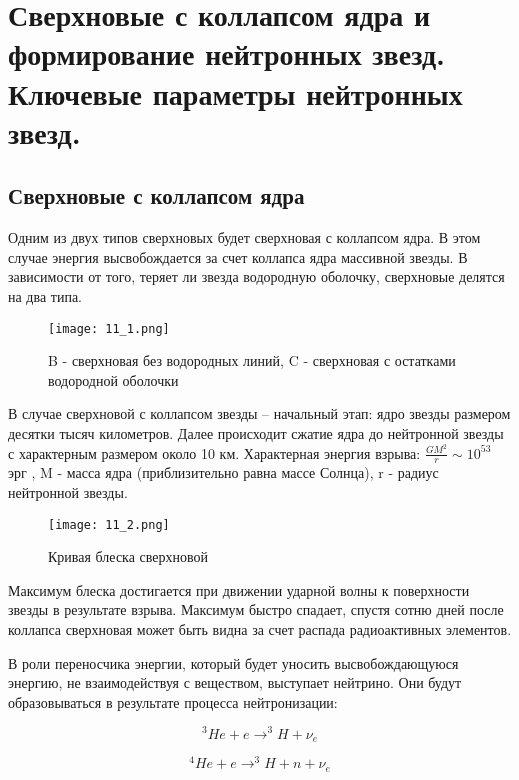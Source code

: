 
\parindent=1cm

\section{Сверхновые с коллапсом ядра и формирование нейтронных звезд. Ключевые параметры
нейтронных звезд.}

\subsection{Сверхновые с коллапсом ядра}
Одним из двух типов сверхновых будет сверхновая с коллапсом ядра. В этом случае энергия высвобождается за счет коллапса ядра массивной звезды. В зависимости от того, теряет ли звезда водородную оболочку, сверхновые делятся на два типа.

\begin{figure}[H]
\centering
\texttt{[image: 11\_1.png]}
\caption{B - сверхновая без водородных линий, C - сверхновая с остатками водородной оболочки}
\label{ЛЕЙБЛ ДЛЯ ССЫЛКИ НА КАРТИНКУ}
\end{figure}

В случае сверхновой с коллапсом звезды -- начальный этап: ядро звезды размером десятки тысяч километров. Далее происходит сжатие ядра до нейтронной звезды с характерным размером около 10 км. Характерная энергия взрыва: $\frac{GM^2}{r} \sim 10^{53}$ эрг , M -  масса ядра (приблизительно равна массе Солнца), r - радиус нейтронной звезды. 

\begin{figure}[H]
\centering
\texttt{[image: 11\_2.png]}
\caption{Кривая блеска сверхновой}
\label{ЛЕЙБЛ ДЛЯ ССЫЛКИ НА КАРТИНКУ}
\end{figure}


Максимум блеска достигается при движении ударной волны к поверхности звезды в результате взрыва. Максимум быстро спадает, спустя сотню дней после коллапса сверхновая может быть видна за счет распада радиоактивных элементов. 



В роли переносчика энергии, который будет уносить высвобождающуюся энергию, не взаимодействуя с веществом, выступает нейтрино. Они будут образовываться в результате процесса нейтронизации:

\begin{equation*}
    ^3He + e \rightarrow ^3H + \nu_e
\end{equation*}

\begin{equation*}
    ^4He + e \rightarrow ^3H + n + \nu_e
\end{equation*}

